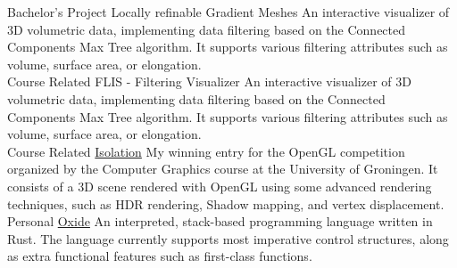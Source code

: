 

\begin{cventries}
    \cventry
    {Bachelor's Project} %
    {Locally refinable Gradient Meshes} %
    {} %
    {} %
    {
        An interactive visualizer of 3D volumetric data, implementing data filtering based on the Connected Components Max Tree algorithm.\newline
		It supports various filtering attributes such as volume, surface area, or elongation.
    }\\\vspace{1em}
    \cventry
    {Course Related} %
    {FLIS - Filtering Visualizer} %
    {} %
    {} %
    {
        An interactive visualizer of 3D volumetric data, implementing data filtering based on the Connected Components Max Tree algorithm.\newline
		It supports various filtering attributes such as volume, surface area, or elongation.
    }\\\vspace{1em}
    \cventry
    {Course Related} %
    {\href{https://github.com/CRefice/isolation}{Isolation\hspace{0.15cm}\faGithubSquare}} %
    {} %
    {} %
    {
        My winning entry for the OpenGL competition organized by the Computer Graphics course at the University of Groningen.\newline
        It consists of a 3D scene rendered with OpenGL using some advanced rendering techniques, such as HDR rendering, Shadow mapping, and vertex displacement.
    }\newpage
    \cventry
    {Personal} %
    {\href{https://github.com/CRefice/oxide}{Oxide\hspace{0.15cm}\faGithubSquare}} %
    {} %
    {} %
    {
        An interpreted, stack-based programming language written in Rust.\newline
        The language currently supports most imperative control structures, along as extra functional features such as first-class functions.
}
\end{cventries}
